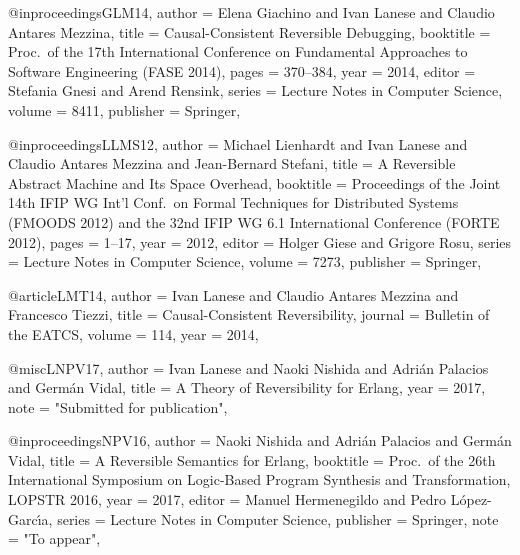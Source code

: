 @inproceedings{GLM14,
  author = {Elena Giachino and Ivan Lanese and Claudio Antares Mezzina},
  title = {Causal-Consistent Reversible Debugging},
  booktitle = {Proc.\ of the 17th International Conference on Fundamental Approaches to Software Engineering ({FASE} 2014)},
  pages = {370--384},
  year = {2014},
  editor = {Stefania Gnesi and Arend Rensink},
  series = {Lecture Notes in Computer Science},
  volume = {8411},
  publisher = {Springer},
}

@inproceedings{LLMS12,
  author = {Michael Lienhardt and Ivan Lanese and Claudio Antares Mezzina and Jean{-}Bernard Stefani},
  title = {A Reversible Abstract Machine and Its Space Overhead},
  booktitle = {Proceedings of the Joint 14th {IFIP} {WG} Int'l Conf.\ on Formal Techniques for Distributed Systems ({FMOODS} 2012) and the 32nd {IFIP} {WG} 6.1 International Conference ({FORTE} 2012)},
  pages = {1--17},
  year = {2012},
  editor = {Holger Giese and Grigore Rosu},
  series = {Lecture Notes in Computer Science},
  volume = {7273},
  publisher = {Springer},
}

@article{LMT14,
  author = {Ivan Lanese and Claudio Antares Mezzina and Francesco Tiezzi},
  title = {Causal-Consistent Reversibility},
  journal = {Bulletin of the {EATCS}},
  volume = {114},
  year = {2014},
}

@misc{LNPV17,
  author = {Ivan Lanese and Naoki Nishida and Adri{\'{a}}n Palacios and Germ{\'{a}}n Vidal},
  title = {A Theory of Reversibility for Erlang},
  year = 2017,
  note = "Submitted for publication",
}

@inproceedings{NPV16,
  author = {Naoki Nishida and Adri{\'{a}}n Palacios and Germ{\'{a}}n Vidal},
  title = {A Reversible Semantics for Erlang},
  booktitle = {Proc.\ of the 26th International Symposium on Logic-Based Program Synthesis and Transformation, LOPSTR 2016},
  year = 2017,
  editor = {Manuel Hermenegildo and Pedro L\'opez-Garc\'{\i}a},
  series = {Lecture Notes in Computer Science},
  publisher = {Springer},
  note = "To appear",
}


